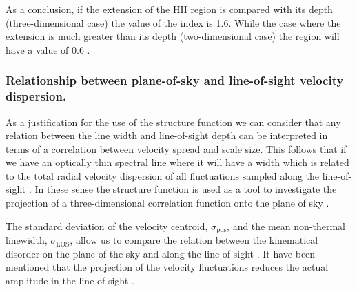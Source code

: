 \documentclass[fleqn,usenatbib, useAMS, a4paper]{mnras}
\newcommand\pos{\ensuremath{_{\mathrm{pos}}}}
\begin{document}
As a conclusion, if the extension of the HII region is compared with its depth (three-dimensional case) the value of the index is 1.6. 
While the case where the extension is much greater than its depth (two-dimensional case) the region will have a value of 0.6 \citep{von1951methode, munch1958internal,1987ApJ...317..686O}.


\subsubsection{Relationship between plane-of-sky and line-of-sight velocity dispersion.}


As a justification for the use of the structure function we can consider that any relation between the line width and line-of-sight depth can be interpreted in terms of a correlation between velocity spread and scale size.
This follows that if we have an optically thin spectral line where it will have a width which is related to the total radial velocity dispersion of all fluctuations sampled along the line-of-sight \citep{1984ApJ...277..556S}. 
In these sense the structure function is used as a tool to investigate the projection of a three-dimensional correlation function onto the plane of sky \citep{arthur2016turbulence}.

The standard deviation of the velocity centroid, \(\sigma\pos\), and the mean non-thermal linewidth, \(\sigma_{\text{LOS}}\), allow us to compare the relation between the kinematical disorder on the plane-of-the sky and along the line-of-sight  \citep{2011MNRAS.413..705L}.
It have been mentioned that the projection of the velocity fluctuations reduces the actual amplitude in the line-of-sight \citep{1984ApJ...277..556S,arthur2016turbulence}.
\end{document}
